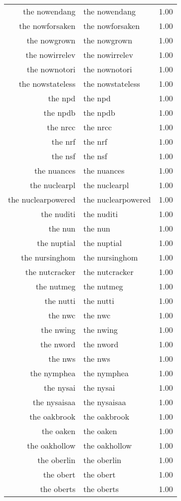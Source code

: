 \begin{table}[ht]
\begin{tabular}{rlr}
  the nowendang & the nowendang & 1.00 \\ 
  the nowforsaken & the nowforsaken & 1.00 \\ 
  the nowgrown & the nowgrown & 1.00 \\ 
  the nowirrelev & the nowirrelev & 1.00 \\ 
  the nownotori & the nownotori & 1.00 \\ 
  the nowstateless & the nowstateless & 1.00 \\ 
  the npd & the npd & 1.00 \\ 
  the npdb & the npdb & 1.00 \\ 
  the nrcc & the nrcc & 1.00 \\ 
  the nrf & the nrf & 1.00 \\ 
  the nsf & the nsf & 1.00 \\ 
  the nuances & the nuances & 1.00 \\ 
  the nuclearpl & the nuclearpl & 1.00 \\ 
  the nuclearpowered & the nuclearpowered & 1.00 \\ 
  the nuditi & the nuditi & 1.00 \\ 
  the nun & the nun & 1.00 \\ 
  the nuptial & the nuptial & 1.00 \\ 
  the nursinghom & the nursinghom & 1.00 \\ 
  the nutcracker & the nutcracker & 1.00 \\ 
  the nutmeg & the nutmeg & 1.00 \\ 
  the nutti & the nutti & 1.00 \\ 
  the nwc & the nwc & 1.00 \\ 
  the nwing & the nwing & 1.00 \\ 
  the nword & the nword & 1.00 \\ 
  the nws & the nws & 1.00 \\ 
  the nymphea & the nymphea & 1.00 \\ 
  the nysai & the nysai & 1.00 \\ 
  the nysaisaa & the nysaisaa & 1.00 \\ 
  the oakbrook & the oakbrook & 1.00 \\ 
  the oaken & the oaken & 1.00 \\ 
  the oakhollow & the oakhollow & 1.00 \\ 
  the oberlin & the oberlin & 1.00 \\ 
  the obert & the obert & 1.00 \\ 
  the oberts & the oberts & 1.00 \\ 

\end{tabular}
\end{table}
